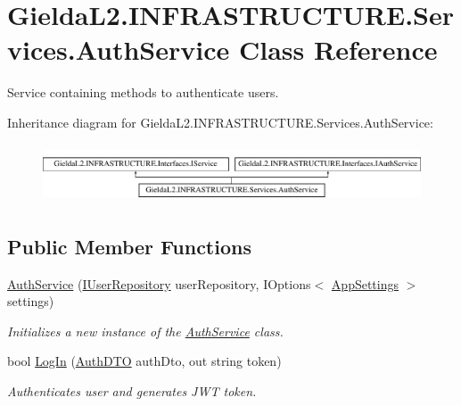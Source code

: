\hypertarget{class_gielda_l2_1_1_i_n_f_r_a_s_t_r_u_c_t_u_r_e_1_1_services_1_1_auth_service}{}\section{Gielda\+L2.\+I\+N\+F\+R\+A\+S\+T\+R\+U\+C\+T\+U\+R\+E.\+Services.\+Auth\+Service Class Reference}
\label{class_gielda_l2_1_1_i_n_f_r_a_s_t_r_u_c_t_u_r_e_1_1_services_1_1_auth_service}


Service containing methods to authenticate users.  


Inheritance diagram for Gielda\+L2.\+I\+N\+F\+R\+A\+S\+T\+R\+U\+C\+T\+U\+R\+E.\+Services.\+Auth\+Service\+:\begin{figure}[H]
\begin{center}
\leavevmode
\includegraphics[height=1.755486cm]{class_gielda_l2_1_1_i_n_f_r_a_s_t_r_u_c_t_u_r_e_1_1_services_1_1_auth_service}
\end{center}
\end{figure}
\subsection*{Public Member Functions}
\begin{DoxyCompactItemize}
\item 
\mbox{\hyperlink{class_gielda_l2_1_1_i_n_f_r_a_s_t_r_u_c_t_u_r_e_1_1_services_1_1_auth_service_a6a30d7fd76c76e6119bc157dcc319bea}{Auth\+Service}} (\mbox{\hyperlink{interface_gielda_l2_1_1_d_b_1_1_interfaces_1_1_i_user_repository}{I\+User\+Repository}} user\+Repository, I\+Options$<$ \mbox{\hyperlink{class_gielda_l2_1_1_i_n_f_r_a_s_t_r_u_c_t_u_r_e_1_1_helpers_1_1_app_settings}{App\+Settings}} $>$ settings)
\begin{DoxyCompactList}\small\item\em Initializes a new instance of the \mbox{\hyperlink{class_gielda_l2_1_1_i_n_f_r_a_s_t_r_u_c_t_u_r_e_1_1_services_1_1_auth_service}{Auth\+Service}} class. \end{DoxyCompactList}\item 
bool \mbox{\hyperlink{class_gielda_l2_1_1_i_n_f_r_a_s_t_r_u_c_t_u_r_e_1_1_services_1_1_auth_service_a11f0907fef09930d6533a6f6287d49ba}{Log\+In}} (\mbox{\hyperlink{class_gielda_l2_1_1_i_n_f_r_a_s_t_r_u_c_t_u_r_e_1_1_d_t_o_1_1_auth_d_t_o}{Auth\+D\+TO}} auth\+Dto, out string token)
\begin{DoxyCompactList}\small\item\em Authenticates user and generates J\+WT token. \end{DoxyCompactList}\end{DoxyCompactItemize}


